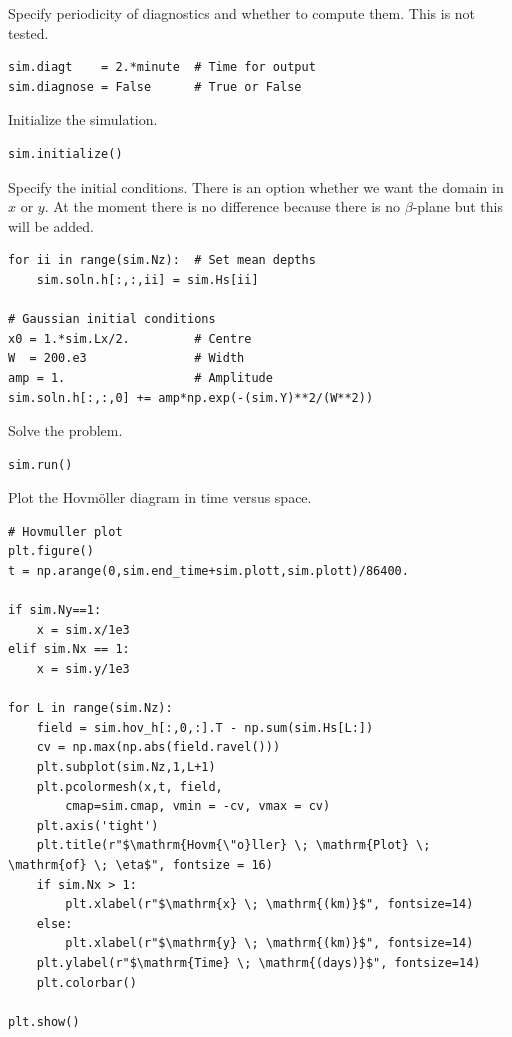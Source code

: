 \documentclass[11pt]{article}
\begin{document}
Specify periodicity of diagnostics and whether to compute them.  This is not tested.
\begin{lstlisting}
sim.diagt    = 2.*minute  # Time for output
sim.diagnose = False      # True or False
\end{lstlisting}

Initialize the simulation.
\begin{lstlisting}
sim.initialize()
\end{lstlisting}

Specify the initial conditions.  There is an option whether we want the domain in $x$ or $y$.  At the moment there is no difference because there is no $\beta$-plane but this will be added.
\begin{lstlisting}
for ii in range(sim.Nz):  # Set mean depths
    sim.soln.h[:,:,ii] = sim.Hs[ii]

# Gaussian initial conditions
x0 = 1.*sim.Lx/2.         # Centre
W  = 200.e3               # Width
amp = 1.                  # Amplitude
sim.soln.h[:,:,0] += amp*np.exp(-(sim.Y)**2/(W**2))
\end{lstlisting}

Solve the problem.
\begin{lstlisting}
sim.run()             
\end{lstlisting}

Plot the Hovm\"oller diagram in time versus space.
\begin{lstlisting}
# Hovmuller plot
plt.figure()
t = np.arange(0,sim.end_time+sim.plott,sim.plott)/86400.

if sim.Ny==1:
    x = sim.x/1e3
elif sim.Nx == 1:
    x = sim.y/1e3

for L in range(sim.Nz):
    field = sim.hov_h[:,0,:].T - np.sum(sim.Hs[L:])
    cv = np.max(np.abs(field.ravel()))
    plt.subplot(sim.Nz,1,L+1)
    plt.pcolormesh(x,t, field,
        cmap=sim.cmap, vmin = -cv, vmax = cv)
    plt.axis('tight')
    plt.title(r"$\mathrm{Hovm{\"o}ller} \; \mathrm{Plot} \; \mathrm{of} \; \eta$", fontsize = 16)
    if sim.Nx > 1:
        plt.xlabel(r"$\mathrm{x} \; \mathrm{(km)}$", fontsize=14)
    else:
        plt.xlabel(r"$\mathrm{y} \; \mathrm{(km)}$", fontsize=14)
    plt.ylabel(r"$\mathrm{Time} \; \mathrm{(days)}$", fontsize=14)
    plt.colorbar()

plt.show()
\end{lstlisting}
\end{document}
